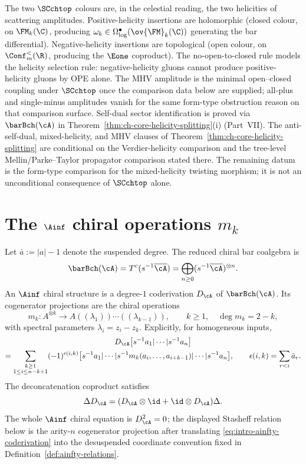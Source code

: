 \begin{observation}
\label{obs:helicity-directionality}
The two $\SCchtop$ colours are, in the celestial reading, the
two helicities of scattering amplitudes. Positive-helicity
insertions are holomorphic (closed colour, on $\FM_k(\C)$,
producing $\omega_k \in \Omega^\bullet_{\log}(\ov{\FM}_k(\C))$
generating the bar differential). Negative-helicity insertions
are topological (open colour, on $\Conf_m^{<}(\R)$, producing
the $\Eone$ coproduct). The no-open-to-closed rule models the
helicity selection rule: negative-helicity gluons cannot produce
positive-helicity gluons by OPE alone. The MHV amplitude is the
minimal open--closed coupling under $\SCchtop$ once the comparison
data below are supplied; all-plus and single-minus amplitudes vanish
for the same form-type obstruction reason on that comparison surface.
Self-dual sector identification is proved via
$\barBch(\cA)$ in
Theorem~\textup{\ref{thm:ch-core-helicity-splitting}(i)}
(Part~\textup{VII}).  The anti-self-dual, mixed-helicity, and MHV
clauses of Theorem~\textup{\ref{thm:ch-core-helicity-splitting}} are
conditional on the Verdier-helicity comparison and the tree-level
Mellin/Parke--Taylor propagator comparison stated there.  The remaining
datum is the form-type comparison for the mixed-helicity twisting
morphism; it is not an unconditional consequence of \(\SCchtop\) alone.
\end{observation}

\section*{The $\Ainf$ chiral operations $m_k$}

Let $\bar a:=|a|-1$ denote the suspended degree. The reduced chiral
bar coalgebra is
\[
\barBch(\cA)=T^c(s^{-1}\overline{\cA})
=\bigoplus_{n\ge0}(s^{-1}\overline{\cA})^{\otimes n}.
\]
An $\Ainf$ chiral structure is a degree-$1$ coderivation $D_\cA$ of
$\barBch(\cA)$. Its cogenerator projections are the chiral operations
\[
m_k \colon A^{\otimes k} \longrightarrow
A((\lambda_1))\cdots((\lambda_{k-1})),
\qquad k \geq 1,\quad \deg m_k=2-k,
\]
with spectral parameters $\lambda_i=z_i-z_k$. Explicitly, for
homogeneous inputs,
\begin{multline}
\label{eq:intro-ainfty-coderivation}
D_\cA\bigl[s^{-1}a_1|\cdots|s^{-1}a_n\bigr]  \\
=
\sum_{\substack{k\ge1\\1\le i\le n-k+1}}
(-1)^{\epsilon(i,k)}
\bigl[s^{-1}a_1|\cdots|
s^{-1}m_k(a_i,\ldots,a_{i+k-1})|\cdots|s^{-1}a_n\bigr],
\qquad
\epsilon(i,k)=\sum_{r<i}\bar a_r .
\end{multline}
The deconcatenation coproduct satisfies
\[
\Delta D_\cA=(D_\cA\otimes\id+\id\otimes D_\cA)\Delta.
\]
The whole $\Ainf$ chiral equation is $D_\cA^2=0$; the displayed
Stasheff relation below is the arity-$n$ cogenerator projection after
translating \eqref{eq:intro-ainfty-coderivation} into the desuspended
coordinate convention fixed in Definition~\ref{def:ainfty-relations}.


